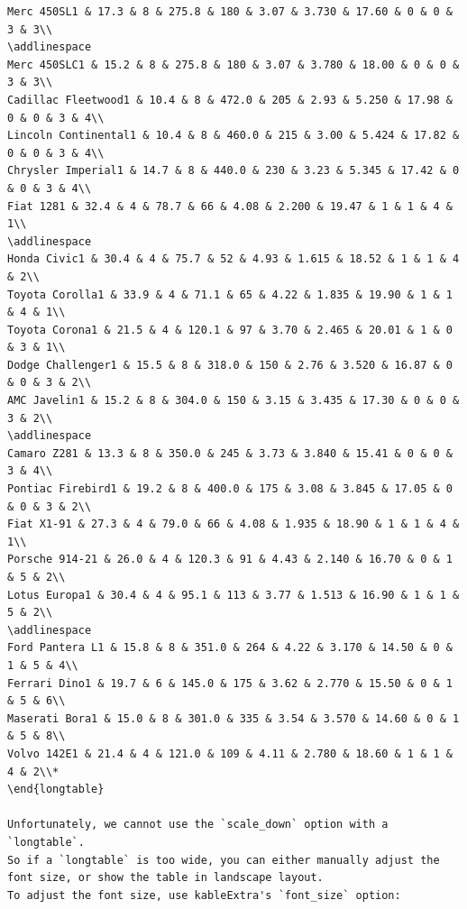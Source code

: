 \documentclass[a4paper, nobind]{templates/ociamthesis}
\begin{document}
\begin{verbatim}
Merc 450SL1 & 17.3 & 8 & 275.8 & 180 & 3.07 & 3.730 & 17.60 & 0 & 0 & 3 & 3\\
\addlinespace
Merc 450SLC1 & 15.2 & 8 & 275.8 & 180 & 3.07 & 3.780 & 18.00 & 0 & 0 & 3 & 3\\
Cadillac Fleetwood1 & 10.4 & 8 & 472.0 & 205 & 2.93 & 5.250 & 17.98 & 0 & 0 & 3 & 4\\
Lincoln Continental1 & 10.4 & 8 & 460.0 & 215 & 3.00 & 5.424 & 17.82 & 0 & 0 & 3 & 4\\
Chrysler Imperial1 & 14.7 & 8 & 440.0 & 230 & 3.23 & 5.345 & 17.42 & 0 & 0 & 3 & 4\\
Fiat 1281 & 32.4 & 4 & 78.7 & 66 & 4.08 & 2.200 & 19.47 & 1 & 1 & 4 & 1\\
\addlinespace
Honda Civic1 & 30.4 & 4 & 75.7 & 52 & 4.93 & 1.615 & 18.52 & 1 & 1 & 4 & 2\\
Toyota Corolla1 & 33.9 & 4 & 71.1 & 65 & 4.22 & 1.835 & 19.90 & 1 & 1 & 4 & 1\\
Toyota Corona1 & 21.5 & 4 & 120.1 & 97 & 3.70 & 2.465 & 20.01 & 1 & 0 & 3 & 1\\
Dodge Challenger1 & 15.5 & 8 & 318.0 & 150 & 2.76 & 3.520 & 16.87 & 0 & 0 & 3 & 2\\
AMC Javelin1 & 15.2 & 8 & 304.0 & 150 & 3.15 & 3.435 & 17.30 & 0 & 0 & 3 & 2\\
\addlinespace
Camaro Z281 & 13.3 & 8 & 350.0 & 245 & 3.73 & 3.840 & 15.41 & 0 & 0 & 3 & 4\\
Pontiac Firebird1 & 19.2 & 8 & 400.0 & 175 & 3.08 & 3.845 & 17.05 & 0 & 0 & 3 & 2\\
Fiat X1-91 & 27.3 & 4 & 79.0 & 66 & 4.08 & 1.935 & 18.90 & 1 & 1 & 4 & 1\\
Porsche 914-21 & 26.0 & 4 & 120.3 & 91 & 4.43 & 2.140 & 16.70 & 0 & 1 & 5 & 2\\
Lotus Europa1 & 30.4 & 4 & 95.1 & 113 & 3.77 & 1.513 & 16.90 & 1 & 1 & 5 & 2\\
\addlinespace
Ford Pantera L1 & 15.8 & 8 & 351.0 & 264 & 4.22 & 3.170 & 14.50 & 0 & 1 & 5 & 4\\
Ferrari Dino1 & 19.7 & 6 & 145.0 & 175 & 3.62 & 2.770 & 15.50 & 0 & 1 & 5 & 6\\
Maserati Bora1 & 15.0 & 8 & 301.0 & 335 & 3.54 & 3.570 & 14.60 & 0 & 1 & 5 & 8\\
Volvo 142E1 & 21.4 & 4 & 121.0 & 109 & 4.11 & 2.780 & 18.60 & 1 & 1 & 4 & 2\\*
\end{longtable}

Unfortunately, we cannot use the `scale_down` option with a `longtable`. 
So if a `longtable` is too wide, you can either manually adjust the font size, or show the table in landscape layout. 
To adjust the font size, use kableExtra's `font_size` option:


\end{verbatim}
\end{document}
